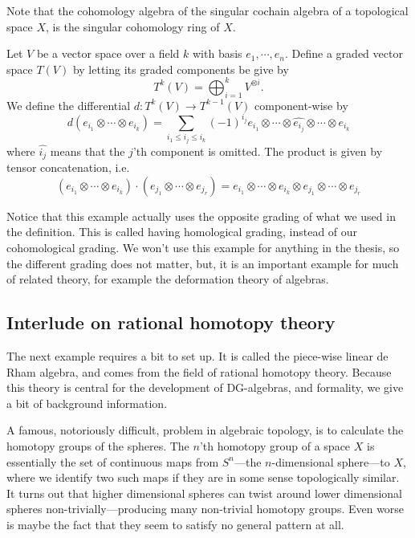 Note that the cohomology algebra of the singular cochain algebra of a topological space $X$, is the singular cohomology ring of $X$.

\begin{example}
Let $V$ be a vector space over a field $k$ with basis $e_1, \cdots, e_n$. Define a graded vector space $T(V)$ by letting its graded components be give by
\begin{equation*}
    T^k(V) = \bigoplus_{i=1}^k V^{\otimes i}.
\end{equation*}
We define the differential $d\colon T^k(V)\longrightarrow T^{k-1}(V)$ component-wise by
\begin{equation*}
    d(e_{i_1}\otimes \cdots \otimes e_{i_k}) = \sum_{i_1\leq i_j\leq i_k}(-1)^{i_j}e_{i_1}\otimes \cdots \otimes \widehat{e_{i_j}}\otimes \cdots \otimes e_{i_k}
\end{equation*}
where $\widehat{i_j}$ means that the $j$'th component is omitted. The product is given by tensor concatenation, i.e. 
\begin{equation*}
    (e_{i_1}\otimes \cdots \otimes e_{i_k})\cdot(e_{j_1}\otimes \cdots \otimes e_{j_r}) = e_{i_1}\otimes \cdots \otimes e_{i_k}\otimes e_{j_1}\otimes \cdots \otimes e_{j_r}
\end{equation*}
\end{example}

Notice that this example actually uses the opposite grading of what we used in the definition. This is called having homological grading, instead of our cohomological grading. We won't use this example for anything in the thesis, so the different grading does not matter, but, it is an important example for much of related theory, for example the deformation theory of algebras. 

\subsection*{Interlude on rational homotopy theory}

The next example requires a bit to set up. It is called the piece-wise linear de Rham algebra, and comes from the field of rational homotopy theory. Because this theory is central for the development of DG-algebras, and formality, we give a bit of background information. 

A famous, notoriously difficult, problem in algebraic topology, is to calculate the homotopy groups of the spheres. The $n$'th homotopy group of a space $X$ is essentially the set of continuous maps from $S^n$---the $n$-dimensional sphere---to $X$, where we identify two such maps if they are in some sense topologically similar. It turns out that higher dimensional spheres can twist around lower dimensional spheres non-trivially---producing many non-trivial homotopy groups. Even worse is maybe the fact that they seem to satisfy no general pattern at all. 

